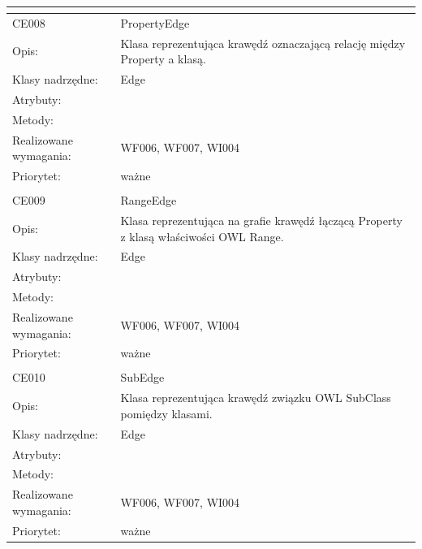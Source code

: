 \begin{center}
\begin{longtable}{|m{3cm}|m{9cm}|}
\multicolumn{2}{c}{} \\
 \hline

CE008 & PropertyEdge \\ \hline
Opis: &  Klasa reprezentująca krawędź oznaczającą relację między Property a klasą.   \\ \hline
Klasy nadrzędne: & Edge    \\ \hline
Atrybuty: & %
 \\ \hline
Metody: & %
  \\ \hline
Realizowane wymagania: & WF006, WF007, WI004 \\ \hline
Priorytet: & ważne  \\ \hline

\multicolumn{2}{c}{} \\
 \hline

CE009 & RangeEdge \\ \hline
Opis: & Klasa reprezentująca na grafie krawędź łączącą Property z klasą właściwości OWL Range.     \\ \hline
Klasy nadrzędne: & Edge    \\ \hline
Atrybuty: & %
 \\ \hline
Metody: & %
  \\ \hline
Realizowane wymagania: & WF006, WF007, WI004 \\ \hline
Priorytet: & ważne  \\ \hline

\multicolumn{2}{c}{} \\
 \hline

CE010 & SubEdge \\ \hline
Opis: & Klasa reprezentująca krawędź związku OWL SubClass pomiędzy klasami.   \\ \hline
Klasy nadrzędne: & Edge    \\ \hline
Atrybuty: & %
 \\ \hline
Metody: & %
  \\ \hline
Realizowane wymagania: & WF006, WF007, WI004 \\ \hline
Priorytet: & ważne  \\ \hline


\end{longtable}
\end{center}
